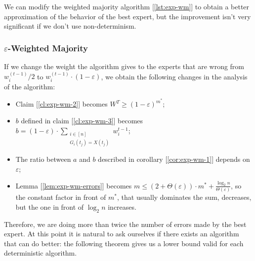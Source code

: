 We can modify the weighted majority algorithm [\ref{lst:exp-wm}] to obtain a better approximation of the behavior of the best expert, but the improvement isn't very significant if we don't use non-determinism.


\subsubsection{$\varepsilon$-Weighted Majority}
\label{sec:exp-weighted-bet}

If we change the weight the algorithm gives to the experts that are wrong from $w_i^{(t-1)}/2$ to $w_i^{(t-1)} \cdot (1 - \varepsilon)$, we obtain the following changes in the analysis of the algorithm:
\begin{itemize}
    \item Claim [\ref{cl:exp-wm-2}] becomes $W^T \geq (1 - \varepsilon)^{m^*}$;
    \item $b$ defined in claim [\ref{cl:exp-wm-3}] becomes $b = (1 - \varepsilon) \cdot \sum_{\substack{i \in [n]\\ G_i(t_j) = X(t_j)}} w_i^{t-1}$;
    \item The ratio between $a$ and $b$ described in corollary [\ref{cor:exp-wm-1}] depends on $\varepsilon$;
    \item Lemma [\ref{lem:exp-wm-errors}] becomes $m \leq (2 + \Theta(\varepsilon)) \cdot m^* + \frac{\log_2 n}{\Theta(\varepsilon)}$, so the constant factor in front of $m^*$, that usually dominates the sum, decreases, but the one in front of $\log_2 n$ increases.
\end{itemize}

Therefore, we are doing more than twice the number of errors made by the best expert. At this point it is natural to ask ourselves if there exists an algorithm that can do better: the following theorem gives us a lower bound valid for each deterministic algorithm.

